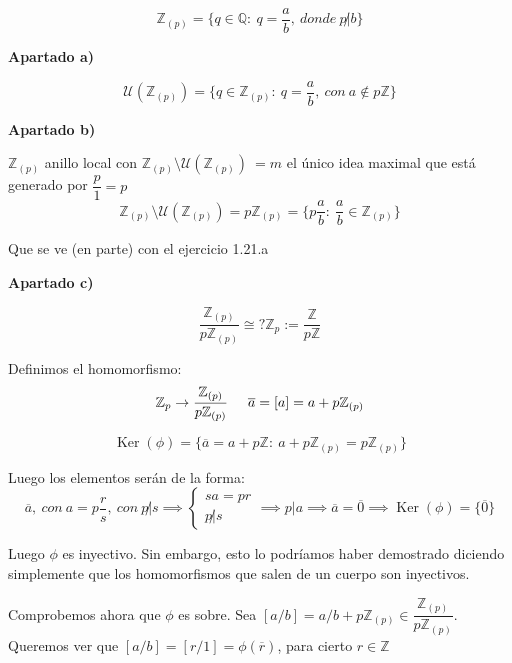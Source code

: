 \documentclass[openany]{book}
\begin{document}
\setcounter{ex}{21}

\begin{exercise}
    $$ \mathbb{Z}_{(p)} = \{q \in \mathbb{Q}:\ q = \dfrac{a}{b},\ donde\ p \not| b\} $$

    \begin{flushright}
        \textbf{Apartado a)}
    \end{flushright}
    
    $$ \mathcal{U}(\mathbb{Z}_{(p)}) = \{q \in \mathbb{Z}_{(p)}:\ q = \dfrac{a}{b},\ con\ a \not \in p\mathbb{Z}\} $$

    \begin{flushright}
        \textbf{Apartado b)}
    \end{flushright}
    $ \mathbb{Z}_{(p)} $ anillo local con $ \mathbb{Z}_{(p)} \setminus \mathcal{U}(\mathbb{Z}_{(p)})\ = m$ el único idea maximal que está generado por $ \dfrac{p}{1}=p $ 
    $$ \mathbb{Z}_{(p)} \setminus \mathcal{U}(\mathbb{Z}_{(p)}) = p\mathbb{Z}_{(p)} = \{p \dfrac{a}{b} :\ \dfrac{a}{b} \in \mathbb{Z}_{(p)}\} $$

    Que se ve (en parte) con el ejercicio 1.21.a

    \begin{flushright}
        \textbf{Apartado c)}
    \end{flushright}
    $$ \dfrac{\mathbb{Z}_{(p)}}{p\mathbb{Z}_{(p)}} \cong? \mathbb{Z}_{p} := \dfrac{\mathbb{Z}}{p\mathbb{Z}} $$

    Definimos el homomorfismo:
    $$ \mathbb{Z}_{p} \to \dfrac{\mathbb{Z}_{(p)}}{p\mathbb{Z}_{(p)}}\hspace{5mm}\overline{a} = [a] = a+p\mathbb{Z}_{(p)} $$

    $$ \operatorname{Ker}(\phi) = \{\overline{a} = a+p\mathbb{Z}:\ a+p\mathbb{Z}_{(p)} = p\mathbb{Z}_{(p)}\} $$
    
    Luego los elementos serán de la forma:
    $$ \overline{a},\ con\ a = p \dfrac{r}{s},\ con\ p \not | s \implies \left\{
    \begin{array}{l}
        sa = pr \\
        p \not | s
    \end{array}
    \right.
    \implies p | a \implies \overline{a} = \overline{0} \implies \operatorname{Ker}(\phi) = \{\overline{0}\} $$

    Luego $ \phi $ es inyectivo. Sin embargo, esto lo podríamos haber demostrado diciendo simplemente que los homomorfismos que salen de un cuerpo son inyectivos.

    Comprobemos ahora que $ \phi $ es sobre. Sea $ [a/b] = a/b +p\mathbb{Z}_{(p)} \in \dfrac{\mathbb{Z}_{(p)}}{p\mathbb{Z}_{(p)}} $. Queremos ver que $ [a/b] = [r/1] = \phi(\overline{r}) $, para cierto $ r \in \mathbb{Z} $


\end{exercise}
\end{document}
